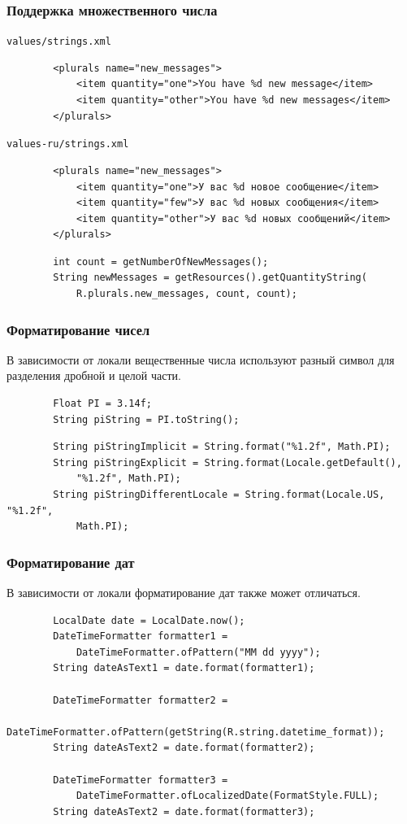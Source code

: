 \documentclass{beamer}
\begin{document}
\begin{frame}[fragile]
    \frametitle{Поддержка множественного числа}
    \texttt{\footnotesize values/strings.xml}
    \begin{verbatim}
        <plurals name="new_messages">
            <item quantity="one">You have %d new message</item>
            <item quantity="other">You have %d new messages</item>
        </plurals>
    \end{verbatim}
    \texttt{\footnotesize values-ru/strings.xml}
    \begin{verbatim}
        <plurals name="new_messages">
            <item quantity="one">У вас %d новое сообщение</item>
            <item quantity="few">У вас %d новых сообщения</item>
            <item quantity="other">У вас %d новых сообщений</item>
        </plurals>
    \end{verbatim}
    \begin{verbatim}
        int count = getNumberOfNewMessages();
        String newMessages = getResources().getQuantityString(
            R.plurals.new_messages, count, count);
    \end{verbatim}
\end{frame}

\begin{frame}[fragile]
    \frametitle{Форматирование чисел}
    В зависимости от локали вещественные числа используют разный символ для
    разделения дробной и целой части.
    \begin{verbatim}
        Float PI = 3.14f;
        String piString = PI.toString();
    \end{verbatim}
    \begin{verbatim}
        String piStringImplicit = String.format("%1.2f", Math.PI);
        String piStringExplicit = String.format(Locale.getDefault(),
            "%1.2f", Math.PI);
        String piStringDifferentLocale = String.format(Locale.US, "%1.2f",
            Math.PI);
    \end{verbatim}
\end{frame}

\begin{frame}[fragile]
    \frametitle{Форматирование дат}
    В зависимости от локали форматирование дат также может отличаться.
    \begin{verbatim}
        LocalDate date = LocalDate.now();
        DateTimeFormatter formatter1 =
            DateTimeFormatter.ofPattern("MM dd yyyy");
        String dateAsText1 = date.format(formatter1);

        DateTimeFormatter formatter2 =
            DateTimeFormatter.ofPattern(getString(R.string.datetime_format));
        String dateAsText2 = date.format(formatter2);

        DateTimeFormatter formatter3 =
            DateTimeFormatter.ofLocalizedDate(FormatStyle.FULL);
        String dateAsText2 = date.format(formatter3);
    \end{verbatim}
\end{frame}
\end{document}
